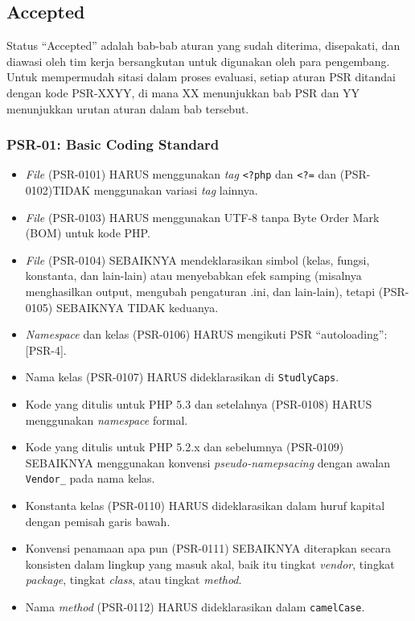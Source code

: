 \subsection{Accepted}
\label{subsec:accepted}
Status ``Accepted'' adalah bab-bab aturan yang sudah diterima, disepakati, dan diawasi oleh tim kerja bersangkutan untuk digunakan oleh para pengembang. Untuk mempermudah sitasi dalam proses evaluasi, setiap aturan PSR ditandai dengan kode PSR-XXYY, di mana XX menunjukkan bab PSR dan YY menunjukkan urutan aturan dalam bab tersebut.

\subsubsection{PSR-01: Basic Coding Standard}
\label{subsubsec:psr01}
\begin{itemize}
	\item \textit{File} (PSR-0101) HARUS menggunakan \textit{tag} \verb|<?php|  dan \verb|<?=| dan (PSR-0102)TIDAK menggunakan variasi \textit{tag} lainnya.
	\item \textit{File} (PSR-0103) HARUS menggunakan UTF-8 tanpa Byte Order Mark (BOM) untuk kode PHP.
	\item \textit{File} (PSR-0104) SEBAIKNYA mendeklarasikan simbol (kelas, fungsi, konstanta, dan lain-lain) atau menyebabkan efek samping (misalnya menghasilkan output, mengubah pengaturan .ini, dan lain-lain), tetapi (PSR-0105) SEBAIKNYA TIDAK keduanya.
	\item \textit{Namespace} dan kelas (PSR-0106) HARUS mengikuti PSR ``autoloading'': [PSR-4].
	\item Nama kelas (PSR-0107) HARUS dideklarasikan di \verb|StudlyCaps|.
	\item Kode yang ditulis untuk PHP 5.3 dan setelahnya (PSR-0108) HARUS menggunakan \textit{namespace} formal.
	\item Kode yang ditulis untuk PHP 5.2.x dan sebelumnya (PSR-0109) SEBAIKNYA menggunakan konvensi \textit{pseudo-namepsacing} dengan awalan  \verb|Vendor_|  pada nama kelas.
	\item Konstanta kelas (PSR-0110) HARUS dideklarasikan dalam huruf kapital dengan pemisah garis bawah.
	\item Konvensi penamaan apa pun (PSR-0111) SEBAIKNYA diterapkan secara konsisten dalam lingkup yang masuk akal, baik itu tingkat \textit{vendor}, tingkat \textit{package}, tingkat \textit{class}, atau tingkat \textit{method}.
	\item Nama \textit{method} (PSR-0112) HARUS dideklarasikan dalam \verb|camelCase|.
\end{itemize}


